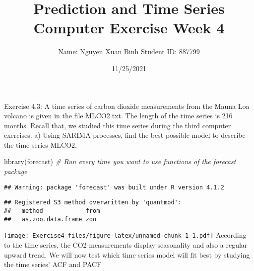 \documentclass[
]{article}
\title{Prediction and Time Series Computer Exercise Week 4}
\author{Name: Nguyen Xuan Binh Student ID: 887799}
\date{11/25/2021}
\newenvironment{Shaded}{\begin{snugshade}}{\end{snugshade}}
\newcommand{\AttributeTok}[1]{\textcolor[rgb]{0.77,0.63,0.00}{#1}}
\newcommand{\CommentTok}[1]{\textcolor[rgb]{0.56,0.35,0.01}{\textit{#1}}}
\newcommand{\DecValTok}[1]{\textcolor[rgb]{0.00,0.00,0.81}{#1}}
\newcommand{\FunctionTok}[1]{\textcolor[rgb]{0.00,0.00,0.00}{#1}}
\newcommand{\NormalTok}[1]{#1}
\newcommand{\OtherTok}[1]{\textcolor[rgb]{0.56,0.35,0.01}{#1}}
\newcommand{\SpecialCharTok}[1]{\textcolor[rgb]{0.00,0.00,0.00}{#1}}
\newcommand{\StringTok}[1]{\textcolor[rgb]{0.31,0.60,0.02}{#1}}
\begin{document}
\maketitle

Exercise 4.3: A time series of carbon dioxide measurements from the
Mauna Loa volcano is given in the file MLCO2.txt. The length of the time
series is 216 months. Recall that, we studied this time series during
the third computer exercises. a) Using SARIMA processes, find the best
possible model to describe the time series MLCO2.

\begin{Shaded}
\begin{Highlighting}[]
\FunctionTok{library}\NormalTok{(forecast) }\CommentTok{\# Run every time you want to use functions of the forecast package}
\end{Highlighting}
\end{Shaded}

\begin{verbatim}
## Warning: package 'forecast' was built under R version 4.1.2
\end{verbatim}

\begin{verbatim}
## Registered S3 method overwritten by 'quantmod':
##   method            from
##   as.zoo.data.frame zoo
\end{verbatim}

\begin{Shaded}
\end{Shaded}

\texttt{[image: Exercise4\_files/figure-latex/unnamed-chunk-1-1.pdf]}
According to the time series, the CO2 measurements display seasonality
and also a regular upward trend. We will now test which time series
model will fit best by studying the time series' ACF and PACF
\end{document}
